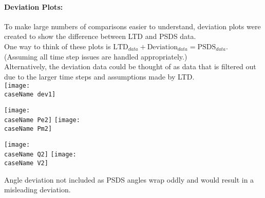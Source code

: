 \documentclass[12pt]{article}
\begin{document}
	\paragraph{Deviation Plots:} To make large numbers of comparisons easier to understand, deviation plots were created to show the difference between LTD and PSDS data.\\
	
	One way to think of these plots is $\text{LTD}_{data}+\text{Deviation}_{data} = \text{PSDS}_{data}$. (Assuming all time step issues are handled appropriately.)\\
	
	Alternatively, the deviation data could be thought of as data that is filtered out due to the larger time steps and assumptions made by LTD.\\
	
	\newcommand{\caseName}{miniWECCgenTrip027}
	\texttt{[image: \\caseName dev1]} 
	
	\texttt{[image: \\caseName Pe2]} %
	\texttt{[image: \\caseName Pm2]} 
	
	\texttt{[image: \\caseName Q2]} %
	\texttt{[image: \\caseName V2]} 
	
	Angle deviation not included as PSDS angles wrap oddly and would result in a misleading deviation.
\end{document}
